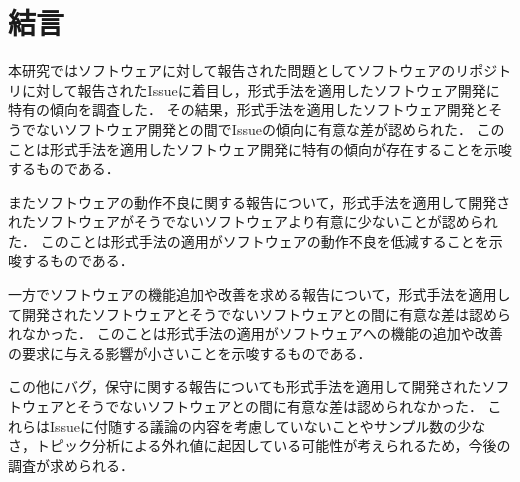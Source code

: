 \documentclass[main]{subfiles}
\begin{document}
\chapter{結言}

本研究ではソフトウェアに対して報告された問題としてソフトウェアのリポジトリに対して報告されたIssueに着目し，形式手法を適用したソフトウェア開発に特有の傾向を調査した．
その結果，形式手法を適用したソフトウェア開発とそうでないソフトウェア開発との間でIssueの傾向に有意な差が認められた．
このことは形式手法を適用したソフトウェア開発に特有の傾向が存在することを示唆するものである．

またソフトウェアの動作不良に関する報告について，形式手法を適用して開発されたソフトウェアがそうでないソフトウェアより有意に少ないことが認められた．
このことは形式手法の適用がソフトウェアの動作不良を低減することを示唆するものである．

一方でソフトウェアの機能追加や改善を求める報告について，形式手法を適用して開発されたソフトウェアとそうでないソフトウェアとの間に有意な差は認められなかった．
このことは形式手法の適用がソフトウェアへの機能の追加や改善の要求に与える影響が小さいことを示唆するものである．

この他にバグ，保守に関する報告についても形式手法を適用して開発されたソフトウェアとそうでないソフトウェアとの間に有意な差は認められなかった．
これらはIssueに付随する議論の内容を考慮していないことやサンプル数の少なさ，トピック分析による外れ値に起因している可能性が考えられるため，今後の調査が求められる．
\end{document}
